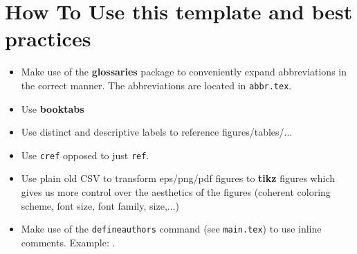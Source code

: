 \section{How To Use this template and best practices}

\begin{itemize}
    \item Make use of the \textbf{glossaries} package to conveniently expand abbreviations in the correct manner. The abbreviations are located in \texttt{abbr.tex}.
    \item Use \textbf{booktabs} 
    \item Use distinct and descriptive labels to reference figures/tables/...
    \item Use \texttt{cref} opposed to just \texttt{ref}.
    \item Use plain old CSV to transform eps/png/pdf figures to \textbf{tikz} figures which gives us more control over the aesthetics of the figures (coherent coloring scheme, font size, font family, size,...)
    \item Make use of the \texttt{defineauthors} command (see \texttt{main.tex}) to use inline comments. Example: .
\end{itemize}
